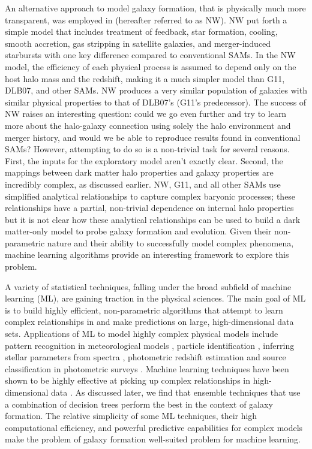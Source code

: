\documentclass[a4paper,fleqn,usenatbib]{mnras}
\begin{document}
\par An alternative approach to model galaxy formation, that is physically much more transparent, was employed in \citet{neistein2010degeneracy} (hereafter referred to as NW). NW put forth a simple model that includes treatment of feedback, star formation, cooling, smooth accretion, gas stripping in satellite galaxies, and merger-induced starbursts with one key difference compared to conventional SAMs. In the NW model, the efficiency of each physical process is assumed to depend only on the host halo mass and the redshift, making it a much simpler model than G11, DLB07, and other SAMs. NW produces a very similar population of galaxies with similar physical properties to that of DLB07's (G11's predecessor). The success of NW raises an interesting question: could we go even further and try to learn more about the halo-galaxy connection using solely the halo environment and merger history, and would we be able to reproduce results found in conventional SAMs? However, attempting to do so is a non-trivial task for several reasons. First, the inputs for the exploratory model aren't exactly clear. Second, the mappings between dark matter halo properties and galaxy properties are incredibly complex, as discussed earlier. NW, G11, and all other SAMs use simplified analytical relationships to capture complex baryonic processes; these relationships have a partial, non-trivial dependence on internal halo properties but it is not clear how these analytical relationships can be used to build a dark matter-only model to probe galaxy formation and evolution. Given their non-parametric nature and their ability to successfully model complex phenomena, machine learning algorithms provide an interesting framework to explore this problem. 

\par
A variety of statistical techniques, falling under the broad subfield of machine learning (ML), are gaining traction in the physical sciences. The main goal of ML is to build highly efficient, non-parametric algorithms that attempt to learn complex relationships in and make predictions on large, high-dimensional data sets. Applications of ML to model highly complex physical models include pattern recognition in meteorological models \citep{liu2011review}, particle identification \citep{roe2005boosted}, inferring stellar parameters from spectra \citep{fiorentin2007estimation}, photometric redshift estimation \citep{kind2013tpz} and source classification in photometric surveys \citep{kim2015hybrid}. Machine learning techniques have been shown to be highly effective at picking up complex relationships in high-dimensional data \citep{witten2005data, johnson2011learning, graff2014skynet}. As discussed later, we find that ensemble techniques that use a combination of decision trees perform the best in the context of galaxy formation. The relative simplicity of some ML techniques, their high computational efficiency, and powerful predictive capabilities for complex models make the problem of galaxy formation well-suited problem for machine learning.
\end{document}
